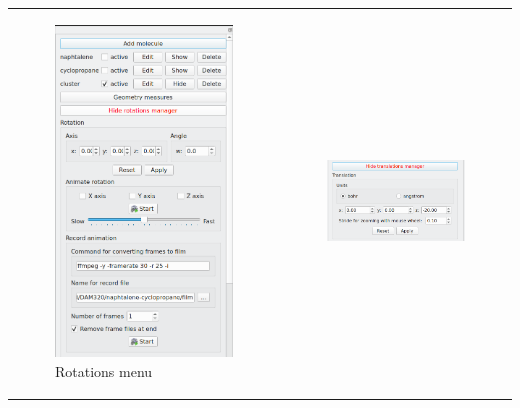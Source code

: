 \documentclass[10pt]{article}
\begin{document}
\begin{center}
\begin{tabular}{lr}
\begin{minipage}{.35\linewidth}
    \begin{figure}[H]
        \begin{center}
            \includegraphics[width=0.55\linewidth]{damqt320_lab_rotations}
        \end{center}
        \caption{Rotations menu \label{fig:4_3_1}}
    \end{figure}
\end{minipage}
&
\begin{minipage}{.35\linewidth}
    \begin{figure}[H]
        \begin{center}
            \includegraphics[width=0.6\linewidth]{damqt320_lab_translations.png}

\end{center}
\end{figure}
\end{minipage}
\end{tabular}
\end{center}
\end{document}
